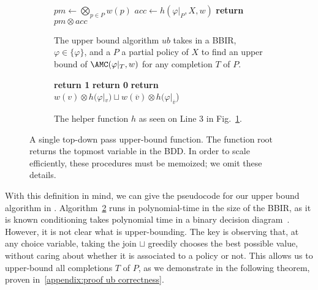 \begin{figure}
  \begin{subfigure}[t]{0.37\linewidth}
    \begin{mdframed}{\footnotesize\begin{algorithmic}[1]
      \State $pm \gets \bigotimes_{p \in P} w(p)$
      \State $acc \gets h(\varphi|_P, X,w)$
      \State \textbf{return} $pm \otimes acc$
      \EndProcedure
    \end{algorithmic}}
    \end{mdframed}
    \caption{The upper bound algorithm $ub$ takes in a BBIR, $\varphi \in \{\varphi\}$,
    and a $P$ a partial policy of $X$
    to find an upper bound of $\AMC(\varphi|_{T},w)$ for any completion $T$ of $P$.}
    \label{algorithm:ub}
  \end{subfigure}
  \hfill
  \begin{subfigure}[t]{0.6\textwidth}
    \begin{mdframed}{\footnotesize\begin{algorithmic}[1]
      \If {$\varphi = \top$} \textbf{return 1}
      \ElsIf {$\varphi = \bot$} \textbf{return 0}
          \textbf{return}
        $w(v) \otimes h(\varphi|_v) \sqcup w(\overline v) \otimes h(\varphi|_{\overline v}$)
        \EndIf
      \EndIf
      \EndProcedure
    \end{algorithmic}}
    \end{mdframed}
    \caption{The helper function $h$ as seen on Line 3 in Fig.~\ref{algorithm:ub}. }
    \label{algorithm:h}
  \end{subfigure}
  \caption{A single top-down pass upper-bound function. The function $\mathrm{root}$
  returns the topmost variable in the BDD. In order to scale efficiently, these
  procedures must be memoized; we omit these details.}
  \label{fig:h}
\end{figure}

With this definition in mind, we can give the pseudocode for our
upper bound algorithm in .
Algorithm~\ref{algorithm:h} runs in polynomial-time
in the size of the BBIR, as it is known
conditioning takes polynomial time in a
binary decision diagram~\citep{darwiche2002knowledge}.
However, it is not clear what  is
upper-bounding.
The key is observing that, at any choice variable, taking the join $\sqcup$
greedily chooses the best possible value,
without caring about whether it is associated to a policy or not.
This allows us to upper-bound all completions $T$ of $P$,
as we demonstrate in the following theorem, proven in~\cref{appendix:proof ub correctness}.

